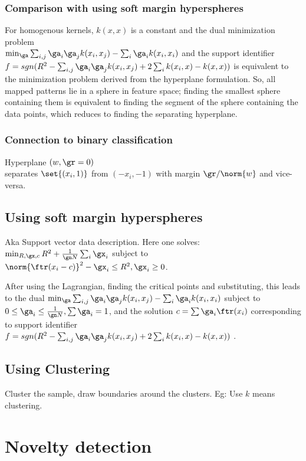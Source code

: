 \documentclass[oneside, article]{memoir}
\begin{document}
\subsubsection{Comparison with using soft margin hyperspheres}
For homogenous kernels, $k(x,x)$ is a constant and the dual minimization problem \\
$\min_{\ga}\sum_{i,j}\ga_{i}\ga_{j}k(x_{i}, x_{j}) - \sum_{i}\ga_{i}k(x_{i}, x_{i})$ and the support identifier \\
$f = sgn(R^{2} - \sum_{i,j}\ga_{i}\ga_{j}k(x_{i}, x_{j}) + 2\sum_{i}k(x_{i}, x)- k(x,x) )$ is equivalent to the minimization problem derived from the hyperplane formulation. So, all mapped patterns lie in a sphere in feature space; finding the smallest sphere containing them is equivalent to finding the segment of the sphere containing the data points, which reduces to finding the separating hyperplane.

\subsubsection{Connection to binary classification}
Hyperplane $(w, \gr = 0)$ \\
separates $\set{(x_{i}, 1)}$ from $(-x_{i}, -1)$ with margin $\gr/\norm{w}$ and vice-versa.

\subsection{Using soft margin hyperspheres}
Aka Support vector data description. Here one solves: 
$\min_{R, \gx, c} R^{2} + \frac{1}{\gn N} \sum_{i}\gx_{i}$ subject to $\norm{\ftr(x_{i} - c)}^{2}  - \gx_{i}\leq R^{2}, \gx_{i}\geq 0$.

After using the Lagrangian, finding the critical points and substituting, this leads to the dual $\min_{\ga}\sum_{i,j}\ga_{i}\ga_{j}k(x_{i}, x_{j}) - \sum_{i}\ga_{i}k(x_{i}, x_{i})$ subject to $0 \leq \ga_{i} \leq \frac{1}{\gn N}, \sum \ga_{i} = 1$, and the solution $c = \sum \ga_{i}\ftr(x_{i})$ corresponding to support identifier $f = sgn(R^{2} - \sum_{i,j}\ga_{i}\ga_{j}k(x_{i}, x_{j}) + 2\sum_{i}k(x_{i}, x)- k(x,x) )$ \chk.

\subsection{Using Clustering}
Cluster the sample, draw boundaries around the clusters. Eg: Use $k$ means clustering.

\section{Novelty detection}
\end{document}
